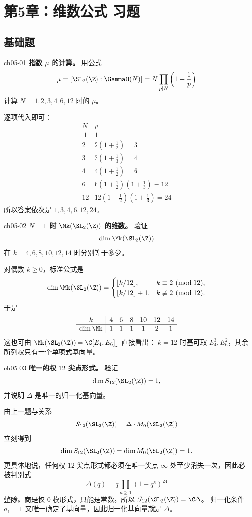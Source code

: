 \chapter{第5章：维数公式 习题}
\difficultykey

\section{基础题 \easy}

\begin{problem}{ch05-01}
\textbf{指数 $\mu$ 的计算。}
用公式
\[
\mu=[\SL_2(\Z):\GammaO(N)]=N\prod_{p\mid N}\left(1+\frac1p\right)
\]
计算 $N=1,2,3,4,6,12$ 时的 $\mu$。
\end{problem}
\begin{solution}
逐项代入即可：
\[
\begin{array}{c|c}
N & \mu \\\ \hline
1 & 1 \\
2 & 2\left(1+\frac12\right)=3 \\
3 & 3\left(1+\frac13\right)=4 \\
4 & 4\left(1+\frac12\right)=6 \\
6 & 6\left(1+\frac12\right)\left(1+\frac13\right)=12 \\
12 & 12\left(1+\frac12\right)\left(1+\frac13\right)=24
\end{array}
\]
所以答案依次是 $1,3,4,6,12,24$。
\end{solution}

\begin{problem}{ch05-02}
\textbf{$N=1$ 时 $\Mk(\SL_2(\Z))$ 的维数。}
验证
\[
\dim \Mk(\SL_2(\Z))
\]
在 $k=4,6,8,10,12,14$ 时分别等于多少。
\end{problem}
\begin{solution}
对偶数 $k\ge 0$，标准公式是
\[
\dim \Mk(\SL_2(\Z))=
\begin{cases}
\lfloor k/12\rfloor,&k\equiv 2\pmod{12},\\
\lfloor k/12\rfloor+1,&k\not\equiv 2\pmod{12}.
\end{cases}
\]
于是
\[
\begin{array}{c|cccccc}
k & 4&6&8&10&12&14\\ \hline
\dim \Mk & 1&1&1&1&2&1
\end{array}
\]
这也可由 $\Mk(\SL_2(\Z))=\C[E_4,E_6]_k$ 直接看出：
$k=12$ 时基可取 $E_4^3,E_6^2$，其余所列权只有一个单项式基向量。
\end{solution}

\begin{problem}{ch05-03}
\textbf{唯一的权 $12$ 尖点形式。}
验证
\[
\dim S_{12}(\SL_2(\Z))=1,
\]
并说明 $\Delta$ 是唯一的归一化基向量。
\end{problem}
\begin{solution}
由上一题与关系
\[
S_{12}(\SL_2(\Z))=\Delta\cdot M_0(\SL_2(\Z))
\]
立刻得到
\[
\dim S_{12}(\SL_2(\Z))=\dim M_0(\SL_2(\Z))=1.
\]
更具体地说，任何权 $12$ 尖点形式都必须在唯一尖点 $\infty$ 处至少消失一次，因此必被判别式
\[
\Delta(q)=q\prod_{n\ge1}(1-q^n)^{24}
\]
整除。商是权 $0$ 模形式，只能是常数。所以 $S_{12}(\SL_2(\Z))=\C\Delta$。
归一化条件 $a_1=1$ 又唯一确定了基向量，因此归一化基向量就是 $\Delta$。
\end{solution}

